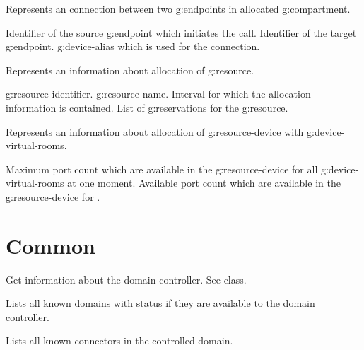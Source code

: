 \begin{Api}
Represents an connection between two \glspl{g:endpoint} in allocated \gls{g:compartment}.
\begin{ApiClassAttributes}
 Identifier of the source \gls{g:endpoint} which initiates the call.
 Identifier of the target \gls{g:endpoint}.
 \Gls{g:device-alias} which is used for the connection.
\end{ApiClassAttributes}

Represents an information about allocation of \gls{g:resource}.
\begin{ApiClassAttributes}
 \Gls{g:resource} identifier.
 \Gls{g:resource} name.
 Interval for which the allocation information is contained.
 List of \glspl{g:reservation} for the \gls{g:resource}.
\end{ApiClassAttributes}

Represents an information about allocation of \gls{g:resource-device} with \glspl{g:device-virtual-room}.
\begin{ApiClassAttributes}
 Maximum port count which are available in the \Gls{g:resource-device} for all \glspl{g:device-virtual-room} at one moment.
 Available port count which are available in the \Gls{g:resource-device} for .
\end{ApiClassAttributes}


\end{Api}

\section{Common}

\begin{Api}

Get information about the domain controller. See  class.

Lists all known domains with status if they are available to the domain controller.

Lists all known connectors in the controlled domain.

\end{Api}



